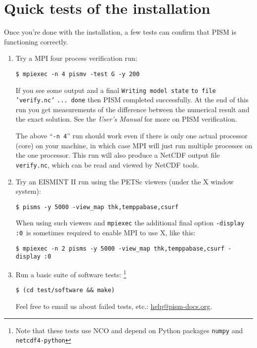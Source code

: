 \documentclass[11pt,final]{amsart}
\begin{document}
\clearpage
\section{Quick tests of the installation}
Once you're done with the installation, a few tests can confirm that PISM is functioning correctly.
\begin{enumerate}
\item Try a MPI four process verification run:

\begin{verbatim}
$ mpiexec -n 4 pismv -test G -y 200
\end{verbatim}

\noindent If you see some output and a final \texttt{Writing model state} \texttt{to file 'verify.nc'} \texttt{... done} then PISM
completed successfully.  At the end of this run you get measurements of the difference between the numerical result and the exact solution.  See the \emph{User's Manual} for more on PISM verification.

The above ``\texttt{-n 4}'' run should work even if there is only one actual processor (core) on your machine, in which case MPI will just run multiple processes on the one processor.  This run will also produce a NetCDF output file \texttt{verify.nc}, which can be read and viewed by NetCDF tools.

\item Try an EISMINT II run using the PETSc viewers (under the X window system):

\begin{verbatim}
$ pisms -y 5000 -view_map thk,temppabase,csurf
\end{verbatim}

\noindent When using such viewers and \texttt{mpiexec} the additional final option \texttt{-display :0} \,is sometimes required to enable MPI to use X, like this:

\begin{verbatim}
$ mpiexec -n 2 pisms -y 5000 -view_map thk,temppabase,csurf -display :0
\end{verbatim}

\item Run a basic suite of software tests: \footnote{Note that these tests use NCO and depend on Python packages \texttt{numpy} and
  \texttt{netcdf4-python}}
\begin{verbatim}
$ (cd test/software && make)
\end{verbatim}

\noindent Feel free to email us about failed tests, etc.: \href{mailto:help@pism-docs.org}{help@pism-docs.org}.
\end{enumerate}
\end{document}
